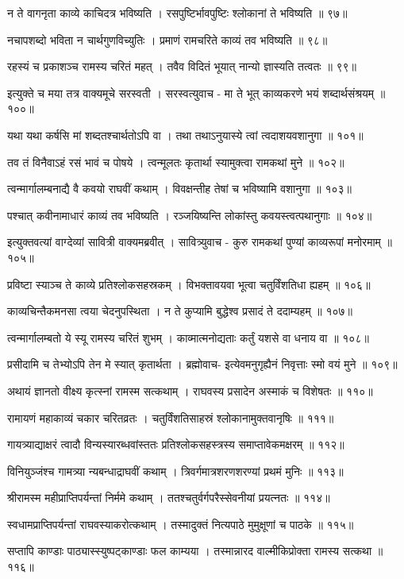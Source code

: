 न ते वागनृता काव्ये काचिदत्र भविष्यति ।
रसपुष्टिर्भावपुष्टिः श्लोकानां ते भविष्यति ॥ ९७॥

नचापशब्दो भविता न चार्थगुणविच्युतिः ।
प्रमाणं रामचरिते काव्यं तव भविष्यति ॥ ९८॥

रहस्यं च प्रकाशञ्च रामस्य चरितं महत् ।
तवैव विदितं भूयात् नान्यो ज्ञास्यति तत्वतः ॥ ९९॥

इत्युक्ते च मया तत्र वाक्यमूचे सरस्वती ।
सरस्वत्युवाच -
मा ते भूत् काव्यकरणे भयं शब्दार्थसंश्रयम् ॥ १००॥

यथा यथा कर्षसि मां शब्दतश्चार्थतोऽपि वा ।
तथा तथाऽनुयास्ये त्वां त्वदाशयवशानुगा ॥ १०१॥

तव तं विनैवाऽहं रसं भावं च पोषये ।
त्वन्मूलतः कृतार्था स्यामुक्त्वा रामकथां मुने ॥ १०२॥

त्वन्मार्गालम्बनाद्यै वै कवयो राघवीं कथाम् ।
विवक्षन्तीह तेषां च भविष्यामि वशानुगा ॥ १०३॥

पश्चात् कवीनामाधारं काव्यं तव भविष्यति ।
रञ्जयिष्यन्ति लोकांस्तु कवयस्त्वत्पथानुगाः ॥ १०४॥

इत्युक्तवत्यां वाग्देव्यां सावित्री वाक्यमब्रवीत् ।
सावित्र्युवाच -
कुरु रामकथां पुण्यां काव्यरूपां मनोरमाम् ॥ १०५॥

प्रविष्टा स्याञ्च ते काव्ये प्रतिश्लोकसहस्रकम् ।
विभक्तावयवा भूत्वा चतुर्विंशतिधा ह्यहम् ॥ १०६॥

काव्यचिन्तैकमनसा त्वया चेदनुपस्थिता ।
न ते कुप्यामि बुद्धेश्व प्रसादं ते ददाम्यहम् ॥ १०७॥

त्वन्मार्गालम्बतो ये स्यू रामस्य चरितं शुभम् ।
काव्मात्मनोद्यताः कर्तुं यशसे वा धनाय वा ॥ १०८॥

प्रसीदामि च तेभ्योऽपि तेन मे स्यात् कृतार्थता ।
ब्रह्मोवाच-
इत्येवमनुगृह्यैनं निवृत्ताः स्मो वयं मुने ॥ १०९॥

अथायं ज्ञानतो वीक्ष्य कृत्स्नां रामस्म सत्कथाम् ।
राघवस्य प्रसादेन अस्माकं च विशेषतः ॥ ११०॥

रामायणं महाकाव्यं चकार चरितव्रतः ।
चतुर्विंशतिसाहस्रं श्लोकानामुक्तवानृषिः ॥ १११॥

गायत्र्याद्याक्षरं त्वादौ विन्यस्यारब्धवांस्ततः
प्रतिश्लोकसहस्त्रस्य समाप्तावेकमक्षरम् ॥ ११२॥

विनियुञ्जंश्च गामत्र्या न्यबन्धाद्राघवीं कथाम् ।
त्रिवर्गमात्रशरणशरण्यां प्रथमं मुनिः ॥ ११३॥

श्रीरामस्म महीप्राप्तिपर्यन्तां निर्ममे कथाम् ।
ततश्चतुर्वर्गपरैस्सेवनीयां प्रयत्नतः ॥ ११४॥

स्वधामप्राप्तिपर्यन्तां राघवस्याकरोत्कथाम् ।
तस्मादुक्तं नित्यपाठे मुमुक्षूणां च पाठके ॥ ११५॥

सप्तापि काण्डाः पाठ्यास्स्युष्पट्काण्डाः फल काम्यया ।
तस्मान्नारद वाल्मीकिप्रोक्ता रामस्य सत्कथा ॥ ११६॥

